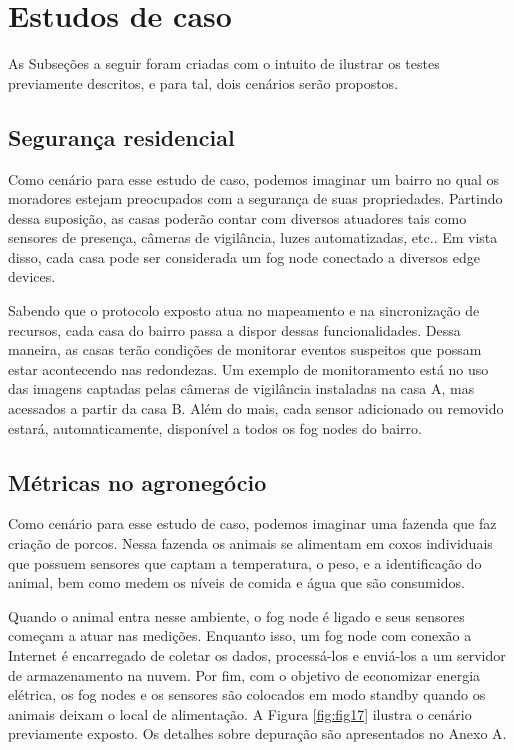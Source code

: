 \section{Estudos de caso}

As Subseções a seguir foram criadas com o intuito de ilustrar os testes previamente descritos, e para tal, dois cenários serão propostos.

\subsection{Segurança residencial}

Como cenário para esse estudo de caso, podemos imaginar um bairro no qual os moradores estejam preocupados com a segurança de suas propriedades.
Partindo dessa suposição, as casas poderão contar com diversos atuadores tais como sensores de presença, câmeras de vigilância, luzes automatizadas, etc..
Em vista disso, cada casa pode ser considerada um fog node conectado a diversos edge devices.

Sabendo que o protocolo exposto atua no mapeamento e na sincronização de recursos, cada casa do bairro passa a dispor dessas funcionalidades.
Dessa maneira, as casas terão condições de monitorar eventos suspeitos que possam estar acontecendo nas redondezas.
Um exemplo de monitoramento está no uso das imagens captadas pelas câmeras de vigilância instaladas na casa A, mas acessados a partir da casa B.
Além do mais, cada sensor adicionado ou removido estará, automaticamente, disponível a todos os fog nodes do bairro.


\subsection{Métricas no agronegócio}


Como cenário para esse estudo de caso, podemos imaginar uma fazenda que faz criação de porcos.
Nessa fazenda os animais se alimentam em coxos individuais que possuem sensores que captam a temperatura, o peso, e a identificação do animal, bem como medem os níveis de comida e água
que são consumidos.

Quando o animal entra nesse ambiente, o fog node é ligado e seus sensores começam a atuar nas medições.
Enquanto isso, um fog node com conexão a Internet é encarregado de coletar os dados, processá-los e enviá-los a um servidor de armazenamento na nuvem.
Por fim, com o objetivo de economizar energia elétrica, os fog nodes e os sensores são colocados em modo standby quando os animais deixam o local de alimentação.
A Figura \ref{fig:fig17} ilustra o cenário previamente exposto. Os detalhes sobre depuração são apresentados no Anexo A.


